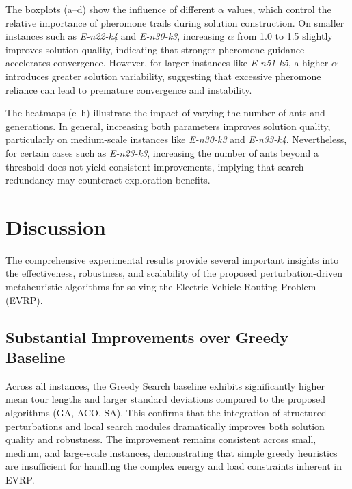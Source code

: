 The boxplots (a--d) show the influence of different $\alpha$ values, which control the relative importance of pheromone trails during solution construction. 
On smaller instances such as \textit{E-n22-k4} and \textit{E-n30-k3}, increasing $\alpha$ from 1.0 to 1.5 slightly improves solution quality, indicating that stronger pheromone guidance accelerates convergence.
However, for larger instances like \textit{E-n51-k5}, a higher $\alpha$ introduces greater solution variability, suggesting that excessive pheromone reliance can lead to premature convergence and instability.

The heatmaps (e--h) illustrate the impact of varying the number of ants and generations.
In general, increasing both parameters improves solution quality, particularly on medium-scale instances like \textit{E-n30-k3} and \textit{E-n33-k4}.
Nevertheless, for certain cases such as \textit{E-n23-k3}, increasing the number of ants beyond a threshold does not yield consistent improvements, implying that search redundancy may counteract exploration benefits.
\section{Discussion}
\label{sec:discussion}

The comprehensive experimental results provide several important insights into the effectiveness, robustness, and scalability of the proposed perturbation-driven metaheuristic algorithms for solving the Electric Vehicle Routing Problem (EVRP).

\subsection{Substantial Improvements over Greedy Baseline}
Across all instances, the Greedy Search baseline exhibits significantly higher mean tour lengths and larger standard deviations compared to the proposed algorithms (GA, ACO, SA). 
This confirms that the integration of structured perturbations and local search modules dramatically improves both solution quality and robustness.
The improvement remains consistent across small, medium, and large-scale instances, demonstrating that simple greedy heuristics are insufficient for handling the complex energy and load constraints inherent in EVRP.

